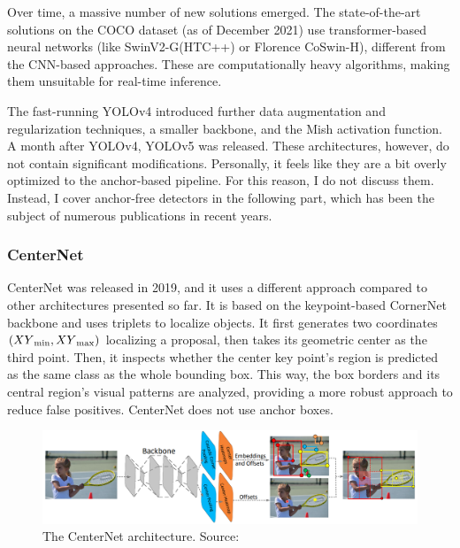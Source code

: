 Over time, a massive number of new solutions emerged. The state-of-the-art solutions on the COCO dataset (as of December 2021) use transformer-based neural networks (like SwinV2-G(HTC++) or Florence CoSwin-H), different from the CNN-based approaches. These are computationally heavy algorithms, making them unsuitable for real-time inference.

The fast-running YOLOv4\cite{YOLOv4} introduced further data augmentation and regularization techniques, a smaller backbone, and the Mish activation function. A month after YOLOv4, YOLOv5\cite{YOLOv5} was released. These architectures, however, do not contain significant modifications. Personally, it feels like they are a bit overly optimized to the anchor-based pipeline. For this reason, I do not discuss them. Instead, I cover anchor-free detectors in the following part, which has been the subject of numerous publications in recent years.

\subsubsection{CenterNet}

CenterNet\cite{CenterNet} was released in 2019, and it uses a different approach compared to other architectures presented so far. It is based on the keypoint-based CornerNet backbone and uses triplets to localize objects. It first generates two coordinates \((XY\textsubscript{min}, XY\textsubscript{max})\) localizing a proposal, then takes its geometric center as the third point. Then, it inspects whether the center key point's region is predicted as the same class as the whole bounding box. This way, the box borders and its central region's visual patterns are analyzed, providing a more robust approach to reduce false positives. CenterNet does not use anchor boxes.

\begin{figure}[htb]
 \centerline{\includegraphics[width=1.0\columnwidth]{.//Figure/Detector/CenterNet.png}}
 \caption{The CenterNet architecture. Source: \cite{CenterNet}}
 \label{fig:CenterNet}
\end{figure}

